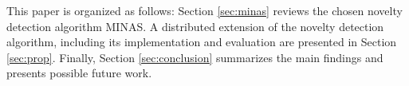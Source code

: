 This paper is organized as follows:
Section \ref{sec:minas} reviews the chosen novelty detection algorithm MINAS.
A distributed extension of the novelty detection algorithm, including its
implementation and evaluation are presented in Section \ref{sec:prop}.
Finally, Section \ref{sec:conclusion} summarizes the main findings and presents
possible future work.









